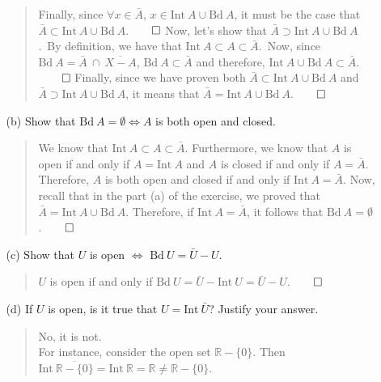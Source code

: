 \documentclass[12pt, a4paper]{article}
\newcommand{\reals}{\mathbb{R}} %
\begin{document}
\begin{itemize}
\begin{itemize}
\begin{quote}
Finally, since $\forall x \in \bar{A}$, $x \in \mbox{Int} \ A \cup \mbox{Bd} \ A$, it must be the case that
$\bar{A} \subset \mbox{Int} \ A \cup \mbox{Bd} \ A$.$\qed$
\newline
\newline
Now, let's show that $\bar{A} \supset \mbox{Int} \ A \cup \mbox{Bd} \ A$.\
By definition, we have that $\mbox{Int} \ A \subset A \subset \bar{A}$.\
Now, since $\mbox{Bd} \ A = \bar{A} \ \cap \ \overline{X - A}$, $\mbox{Bd} \ A \subset \bar{A}$
and therefore, $\mbox{Int} \ A \cup \mbox{Bd} \ A \subset \bar{A}$.$\qed$
\newline
\newline
Finally, since we have proven both $\bar{A} \subset \mbox{Int} \ A \cup \mbox{Bd} \ A$
and $\bar{A} \supset \mbox{Int} \ A \cup \mbox{Bd} \ A$, it means that $\bar{A} = \mbox{Int} \ A \cup \mbox{Bd} \ A$.$\qed$
\end{quote}

\item[]
\item[]

\item[(b)]
Show that $\mbox{Bd} \ A = \emptyset \Leftrightarrow A$ is both open and closed.
\begin{quote}
We know that $\mbox{Int} \ A \subset A \subset \bar{A}$.
Furthermore, we know that $A$ is open if and only if
$A = \mbox{Int} \ A$ and $A$ is closed if and only if
$A = \bar{A}$. Therefore, $A$ is both open and closed
if and only if $\mbox{Int} \ A = \bar{A}$. Now, recall
that in the part (a) of the exercise, we proved that $\bar{A} = \mbox{Int} \ A \cup \mbox{Bd} \ A$.
Therefore, if $\mbox{Int} \ A = \bar{A}$, it follows that $\mbox{Bd} \ A = \emptyset$.$\qed$
\end{quote}

\item[]
\item[]

\item[(c)]
Show that $U$ is open $\Leftrightarrow$ $\mbox{Bd} \ U = \bar{U} - U$.
\begin{quote}
$U$ is open if and only if $\mbox{Bd} \ U = \bar{U} - \mbox{Int} \ U = \bar{U} - U$.$\qed$
\end{quote}

\item[]
\item[]

\item[(d)]
If $U$ is open, is it true that $U = \mbox{Int} \ \bar{U}$? Justify your answer.\
\begin{quote}
No, it is not.\\
For instance, consider the open set $\reals - \{0\}$.
Then $\mbox{Int} \ \overline{\reals - \{0\}} = \mbox{Int} \ \reals = \reals \neq \reals - \{0\}$.
\end{quote}
\end{itemize}


\end{itemize}
\end{document}
